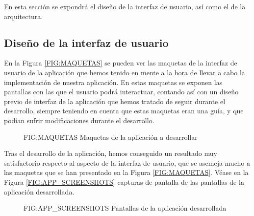 En esta sección se expondrá el diseño de la interfaz de usuario, así como el de la arquitectura.

\subsection{Diseño de la interfaz de usuario\label{SEC:DISENO_INTERFAZ}}

En la Figura \ref{FIG:MAQUETAS} se pueden ver las maquetas de la interfaz de usuario de la aplicación que hemos tenido en mente a la hora de llevar a cabo
la implementación de nuestra aplicación. En estas maquetas se exponen las pantallas con las que el usuario podrá interactuar, contando así con un diseño 
previo de interfaz de la aplicación que hemos tratado de seguir durante el desarrollo, siempre teniendo en cuenta que estas
maquetas eran una guía, y que podían sufrir modificaciones durante el desarrollo.

\begin{figure}[Maquetas de la aplicación a desarrollar]{FIG:MAQUETAS}
    {Maquetas de la aplicación a desarrollar}
\end{figure}

Tras el desarrollo de la aplicación, hemos conseguido un resultado muy satisfactorio respecto al aspecto de la interfaz de 
usuario, que se asemeja mucho a las maquetas que se han presentado en la Figura \ref{FIG:MAQUETAS}. Véase en la Figura
\ref{FIG:APP_SCREENSHOTS} capturas de pantalla de las pantallas de la aplicación desarrollada.

\begin{figure}[Pantallas de la aplicación desarrollada]{FIG:APP_SCREENSHOTS}
  {Pantallas de la aplicación desarrollada}
\end{figure}


